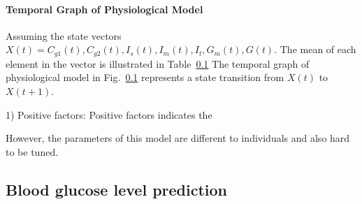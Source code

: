 \paragraph{Temporal Graph of Physiological Model}
Assuming the state vectors $X(t)={C_{g1}(t), C_{g2}(t), I_{s}(t),I_{m}(t), I_{t}, G_{m}(t), G(t)}$. 
The mean of each element in the vector is illustrated in Table~\ref{} 
The temporal graph of physiological model in Fig.~\ref{} represents a state transition from $X(t)$ to $X(t+1)$. 

1) Positive factors:
Positive factors indicates the  

However, the parameters of this model are different to individuals and also hard to be tuned.

\subsection{Blood glucose level prediction}


